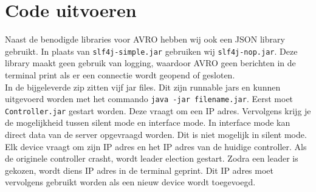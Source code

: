 \documentclass[a4paper]{article}
\begin{document}
	\section{Code uitvoeren}
		Naast de benodigde libraries voor AVRO hebben wij ook een JSON library gebruikt. In plaats van \texttt{slf4j-simple.jar} gebruiken wij \texttt{slf4j-nop.jar}. Deze library maakt geen gebruik van logging, waardoor AVRO geen berichten in de terminal print als er een connectie wordt geopend of gesloten. \\\medskip
		In de bijgeleverde zip zitten vijf jar files. Dit zijn runnable jars en kunnen uitgevoerd worden met het commando \texttt{java -jar filename.jar}. Eerst moet \texttt{Controller.jar} gestart worden. Deze vraagt om een IP adres. Vervolgens krijg je de mogelijkheid tussen silent mode en interface mode. In interface mode kan direct data van de server opgevraagd worden. Dit is niet mogelijk in silent mode. \\
		Elk device vraagt om zijn IP adres en het IP adres van de huidige controller. Als de originele controller crasht, wordt leader election gestart. Zodra een leader is gekozen, wordt diens IP adres in de terminal geprint. Dit IP adres moet vervolgens gebruikt worden als een nieuw device wordt toegevoegd. 
	
\end{document}
